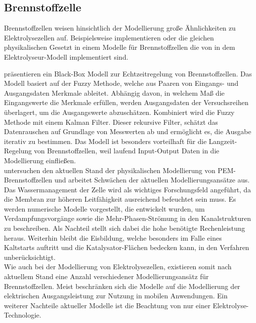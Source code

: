 \subsection{Brennstoffzelle}
Brennstoffzellen weisen hinsichtlich der Modellierung große Ähnlichkeiten zu Elektrolysezellen auf. Beispielsweise implementieren \citet{motapon_development_2012} oder \citet{chugh_experimental_2020} die gleichen physikalischen Gesetzt in einem Modelle für Brennstoffzellen die  von \citet{tjarks_pem-elektrolyse-systeme_2017} in dem Elektrolyseur-Modell implementiert sind.

\citet{barragan_iterative_2020} präsentieren ein Black-Box Modell zur Echtzeitregelung von Brennstoffzellen.
Das Modell basiert auf der Fuzzy Methode, welche aus Paaren von Eingangs- und Ausgangsdaten Merkmale ableitet.
Abhängig davon, in welchem Maß die Eingangswerte die Merkmale erfüllen, werden Ausgangsdaten der Versuchsreihen überlagert, um die Ausgangswerte abzuschätzen. 
Kombiniert wird die Fuzzy Methode mit einem Kalman Filter. 
Dieser rekursive Filter, schätzt das Datenrauschen auf Grundlage von Messwerten ab und ermöglicht es, die Ausgabe iterativ zu bestimmen. 
Das Modell ist besonders vorteilhaft für die Langzeit-Regelung von Brennstoffzellen, weil laufend Input-Output Daten in die Modellierung einfließen.\\

\citet{jiao_challenges_2017} untersuchen den aktuellen Stand der physikalischen Modellierung von PEM-Brennstoffzellen und arbeitet Schwächen der aktuellen Modellierungsansätze aus. Das Wassermanagement der Zelle wird als wichtiges Forschungsfeld angeführt, da die Membran zur höheren Leitfähigkeit ausreichend befeuchtet sein muss.
Es werden numerische Modelle vorgestellt, die entwickelt wurden, um Verdampfungsvorgänge sowie die Mehr-Phasen-Strömung in den Kanalstrukturen zu beschreiben. Als Nachteil stellt sich dabei die hohe benötigte Rechenleistung heraus.
Weiterhin bleibt die Eisbildung, welche besonders im Falle eines Kaltstarts auftritt und die Katalysator-Flächen bedecken kann, in den Verfahren unberücksichtigt.\\

Wie auch bei der Modellierung von Elektrolysezellen, existieren somit nach aktuellem Stand eine Anzahl verschiedener Modellierungsansätz für Brennstoffzellen. Meist beschränken sich die Modelle auf die Modellierung der elektrischen Ausgangsleistung zur Nutzung in mobilen Anwendungen. Ein weiterer Nachteile aktueller Modelle ist die Beachtung von nur einer Elektrolyse-Technologie.

